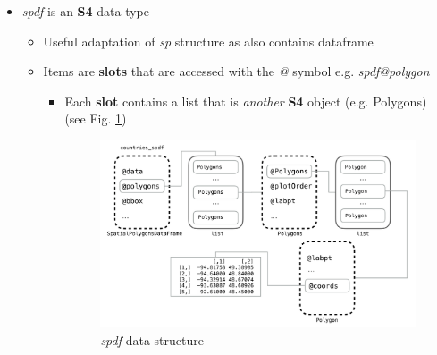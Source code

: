 \documentclass{article}
\begin{document}
\begin{itemize}
    \item \textit{spdf} is an \textbf{S4} data type
    \begin{itemize}
        \item Useful adaptation of \textit{sp} structure as also contains dataframe
        \item Items are \textbf{slots} that are accessed with the \textit{@} symbol e.g. \textit{spdf@polygon}
        \begin{itemize}
            \item Each \textbf{slot} contains a list that is \textit{another} \textbf{S4} object (e.g. Polygons) (see Fig. \ref{spdf data structure})
            
            \begin{figure}[h]
                \centering
                \caption{\textit{spdf} data structure}
                \label{spdf data structure}
                \includegraphics[width=15cm]{spdf.png}
            \end{figure} 


\end{itemize}
\end{itemize}
\end{itemize}
\end{document}
